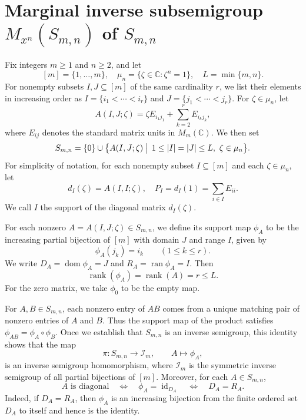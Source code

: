 \documentclass[11pt,a4paper,reqno]{amsart}
\newcommand{\C}{\mathbb C}
\newcommand{\Sn}{S_{m,n}}
\newcommand{\Mn}{M_{x^n}}
\newcommand{\id}{\operatorname{id}}
\DeclareMathOperator{\dom}{dom}
\DeclareMathOperator{\ran}{ran}
\numberwithin{equation}{section}
\begin{document}
\section{Marginal inverse subsemigroup $\Mn(\Sn)$ of $\Sn$} \label{sec:structures}

Fix integers $m\geq 1$ and $n\geq 2$, and let
\[
[m]=\{1,\ldots,m\},\quad \mu_n=\{\zeta\in\C:\zeta^n=1\},\quad L=\min\{m,n\}.
\]
For nonempty subsets $I,J\subseteq[m]$ of the same cardinality $r$, we list their elements in increasing order as $I=\{i_1<\cdots<i_r\}$ and $J=\{j_1<\cdots<j_r\}$. For $\zeta\in\mu_n$, let
\[
A(I,J;\zeta) =\zeta E_{i_1j_1}+\sum_{k=2}^{r} E_{i_kj_k},
\]
where $E_{ij}$ denotes the standard matrix units in $M_m(\C)$. We then set
\begin{equation*}
\Sn=\{0\}\cup \bigl\{A(I,J;\zeta)\bigm| \, 1\leq |I|=|J|\leq L,\ \zeta\in\mu_n \bigr\}.
\end{equation*}
For simplicity of notation, for each nonempty subset $I\subseteq[m]$ and each $\zeta\in\mu_n$, let
\[
d_I(\zeta)=A(I,I;\zeta),\quad P_I=d_I(1)=\sum_{i\in I}E_{ii}.
\]
We call $I$ the support of the diagonal matrix $d_I(\zeta)$.

For each nonzero $A=A(I,J;\zeta)\in\Sn$, we define its support map $\phi_A$ to be the increasing partial bijection of $[m]$ with domain $J$ and range $I$, given by
\[
\phi_A(j_k)=i_k \qquad (1\leq k\leq r).
\]
We write $D_A=\dom\phi_A=J$ and $R_A=\ran\phi_A=I$. Then
$$
\operatorname{rank}(\phi_A)=\operatorname{rank}(A)=r\leq L.
$$
For the zero matrix, we take $\phi_0$ to be the empty map.



For $A,B\in\Sn$, each nonzero entry of $AB$ comes from a unique matching pair of nonzero entries of $A$ and $B$. Thus the support map of the product satisfies $\phi_{AB}=\phi_A\circ\phi_B$. Once we establish that $\Sn$ is an inverse semigroup, this identity shows that the map
$$
\pi\colon \Sn\longrightarrow\mathcal I_m,\qquad A\longmapsto\phi_A,
$$
is an inverse semigroup homomorphism, where $\mathcal I_m$ is the symmetric inverse semigroup of all partial bijections of $[m]$. Moreover, for each $A\in\Sn$,
\begin{equation}\label{eq:diagonal}
A\text{ is diagonal}
\quad\Longleftrightarrow\quad
\phi_A=\id_{D_A}
\quad\Longleftrightarrow\quad
D_A=R_A.
\end{equation}
Indeed, if $D_A=R_A$, then $\phi_A$ is an increasing bijection from the finite ordered set $D_A$ to itself and hence is the identity.
\end{document}
